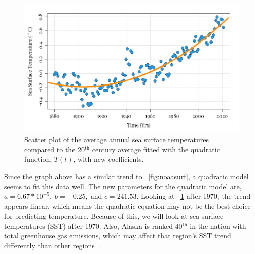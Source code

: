 \begin{figure}[H]
    \centering
    \includegraphics[width=14cm]{Pictures/SST/Global SST Fit.png}
    \caption{\singlespacing
    Scatter plot of the average annual sea surface temperatures compared to the 20$^{\text{th}}$ century average fitted with the quadratic function, $T(t)$, with new coefficients.}
    \label{fig:polyfitSST}
\end{figure}
Since the graph above has a similar trend to \figureautorefname~\ref{fig:noaasurf}, a quadratic model seems to fit this data well.
The new parameters for the quadratic model are, $a=6.67*10^{-5},\; b=-0.25,\; \text{and } c=241.53$.
Looking at \figureautorefname~\ref{fig:polyfitSST} after 1970, the trend appears linear, which means the quadratic equation may not be the best choice for predicting temperature.
Because of this, we will look at sea surface temperatures (SST) after 1970.
Also, Alaska is ranked 40$^{\text{th}}$ in the nation with total greenhouse gas emissions, which may affect that region's SST trend differently than other regions~\cite{adec_2018}.

